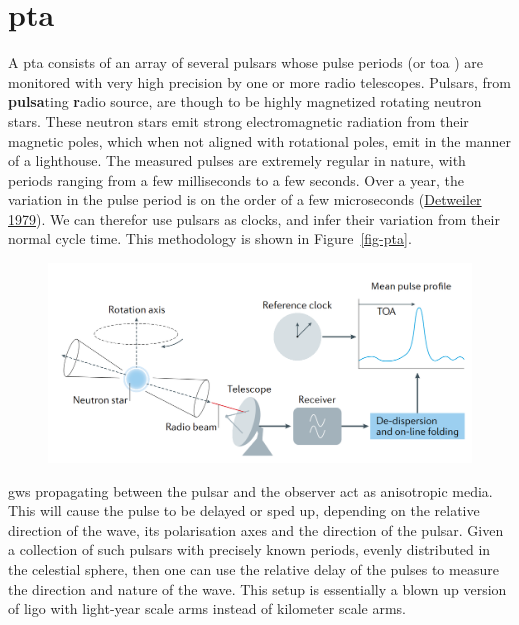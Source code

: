 \documentclass[
  11pt,
  a4paper,
  DIV=11,
  numbers=noendperiod,
  oneside]{scrreprt}
\DeclareRobustCommand{\[}{\begin{equation}}
\DeclareRobustCommand{\]}{\end{equation}}
\begin{document}
\hypertarget{pta}{%
\section{\texorpdfstring{\gls{pta}}{}}\label{pta}}

A \gls{pta} consists of an array of several pulsars whose pulse periods
(or \gls{toa} ) are monitored with very high precision by one or more
radio telescopes. Pulsars, from \textbf{pulsa}ting \textbf{r}adio
source, are though to be highly magnetized rotating neutron stars. These
neutron stars emit strong electromagnetic radiation from their magnetic
poles, which when not aligned with rotational poles, emit in the manner
of a lighthouse. The measured pulses are extremely regular in nature,
with periods ranging from a few milliseconds to a few seconds. Over a
year, the variation in the pulse period is on the order of a few
microseconds (\protect\hyperlink{ref-Detweiler:1979wn}{Detweiler 1979}).
We can therefor use pulsars as clocks, and infer their variation from
their normal cycle time. This methodology is shown in
Figure~\ref{fig-pta}.

\begin{figure}


{\centering \includegraphics{./ptatrans.png}

}

\end{figure}

\glspl{gw} propagating between the pulsar and the observer act as
anisotropic media. This will cause the pulse to be delayed or sped up,
depending on the relative direction of the wave, its polarisation axes
and the direction of the pulsar. Given a collection of such pulsars with
precisely known periods, evenly distributed in the celestial sphere,
then one can use the relative delay of the pulses to measure the
direction and nature of the wave. This setup is essentially a blown up
version of \gls{ligo} with light-year scale arms instead of kilometer
scale arms.
\end{document}
